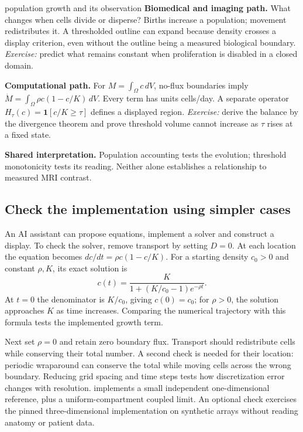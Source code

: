 \documentclass[11pt,a4paper]{article}
\begin{document}
\begin{perspectives}{population growth and its observation}
\textbf{Biomedical and imaging path.} What changes when cells divide or disperse? Births increase a population; movement redistributes it. A thresholded outline can expand because density crosses a display criterion, even without the outline being a measured biological boundary. \emph{Exercise:} predict what remains constant when proliferation is disabled in a closed domain.

\textbf{Computational path.} For $M=\int_\Omega c\,dV$, no-flux boundaries imply $\dot M=\int_\Omega\rho c(1-c/K)\,dV$. Every term has units cells/day. A separate operator $H_\tau(c)=\mathbf1[c/K\geq\tau]$ defines a displayed region. \emph{Exercise:} derive the balance by the divergence theorem and prove threshold volume cannot increase as $\tau$ rises at a fixed state.

\textbf{Shared interpretation.} Population accounting tests the evolution; threshold monotonicity tests its reading. Neither alone establishes a relationship to measured MRI contrast.
\end{perspectives}

\subsection{Check the implementation using simpler cases}
An AI assistant can propose equations, implement a solver and construct a display. To check the solver, remove transport by setting $D=0$. At each location the equation becomes $dc/dt=\rho c(1-c/K)$. For a starting density $c_0>0$ and constant $\rho,K$, its exact solution is
\[
c(t)=\frac{K}{1+(K/c_0-1)e^{-\rho t}}.
\]
At $t=0$ the denominator is $K/c_0$, giving $c(0)=c_0$; for $\rho>0$, the solution approaches $K$ as time increases. Comparing the numerical trajectory with this formula tests the implemented growth term.

Next set $\rho=0$ and retain zero boundary flux. Transport should redistribute cells while conserving their total number. A second check is needed for their location: periodic wraparound can conserve the total while moving cells across the wrong boundary. Reducing grid spacing and time steps tests how discretization error changes with resolution.  implements a small independent one-dimensional reference, plus a uniform-compartment coupled limit. An optional check exercises the pinned three-dimensional implementation on synthetic arrays without reading anatomy or patient data.
\end{document}
